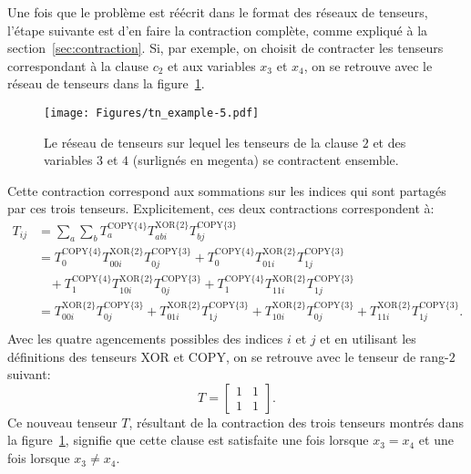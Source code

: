 Une fois que le problème est réécrit dans le format des réseaux de tenseurs, l'étape suivante est d'en faire la contraction complète, comme expliqué à la section~\ref{sec:contraction}.
Si, par exemple, on choisit de contracter les tenseurs correspondant à la clause $c_2$ et aux variables $x_3$ et $x_4$, on se retrouve avec le réseau de tenseurs dans la figure~\ref{fig:tn-example5}.
\begin{figure}[h]
    \centering
    \texttt{[image: Figures/tn\_example-5.pdf]}
    \caption{Le réseau de tenseurs sur lequel les tenseurs de la clause $2$ et des variables $3$ et $4$ (surlignés en megenta) se contractent ensemble.}
    \label{fig:tn-example5}
\end{figure}
Cette contraction correspond aux sommations sur les indices qui sont partagés par ces trois tenseurs.
Explicitement, ces deux contractions correspondent à:
\begin{equation}
    \begin{split}
        T_{ij} &= \sum_{a}\sum_{b}T^{\text{COPY}\{4\}}_{a} T^{\text{XOR}\{2\}}_{abi} T^{\text{COPY}\{3\}}_{bj}\\
        &= T^{\text{COPY}\{4\}}_{0} T^{\text{XOR}\{2\}}_{00i} T^{\text{COPY}\{3\}}_{0j} + T^{\text{COPY}\{4\}}_{0} T^{\text{XOR}\{2\}}_{01i} T^{\text{COPY}\{3\}}_{1j}\\
        &\ \ \ \ + T^{\text{COPY}\{4\}}_{1} T^{\text{XOR}\{2\}}_{10i} T^{\text{COPY}\{3\}}_{0j} + T^{\text{COPY}\{4\}}_{1} T^{\text{XOR}\{2\}}_{11i} T^{\text{COPY}\{3\}}_{1j}\\
        &= T^{\text{XOR}\{2\}}_{00i} T^{\text{COPY}\{3\}}_{0j} + T^{\text{XOR}\{2\}}_{01i} T^{\text{COPY}\{3\}}_{1j} + T^{\text{XOR}\{2\}}_{10i} T^{\text{COPY}\{3\}}_{0j} + T^{\text{XOR}\{2\}}_{11i} T^{\text{COPY}\{3\}}_{1j}.\\
    \end{split}
\end{equation}
Avec les quatre agencements possibles des indices $i$ et $j$ et en utilisant les définitions des tenseurs XOR et COPY, on se retrouve avec le tenseur de rang-$2$ suivant:
\begin{equation}
    T = \begin{bmatrix}
        1 & 1\\
        1 & 1
    \end{bmatrix}.
\end{equation}
Ce nouveau tenseur $T$, résultant de la contraction des trois tenseurs montrés dans la figure~\ref{fig:tn-example5}, signifie que cette clause est satisfaite une fois lorsque $x_3 = x_4$ et une fois lorsque $x_3 \ne x_4$.

